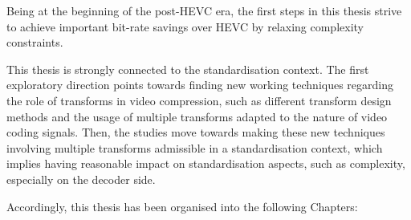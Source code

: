 \documentclass[11pt,a4paper,openright,twoside]{book}
\numberwithin{equation}{section} %
\numberwithin{figure}{section} %
\numberwithin{table}{section} %
\begin{document}
\bigskip

Being at the beginning of the post-\acs{HEVC} era, the first steps in this
thesis strive to achieve important bit-rate savings over \acs{HEVC} by
relaxing complexity constraints.

This thesis is strongly connected to the standardisation context.
The first exploratory direction points towards finding new working techniques
regarding the role of transforms in video compression, such as different
transform design methods and the usage of multiple transforms adapted to the
nature of video coding signals.
Then, the studies move towards making these new techniques involving multiple
transforms admissible in a standardisation context, which implies having
reasonable impact on standardisation aspects, such as complexity, especially
on the decoder side.

\bigskip

Accordingly, this thesis has been organised into the following Chapters:
\end{document}
